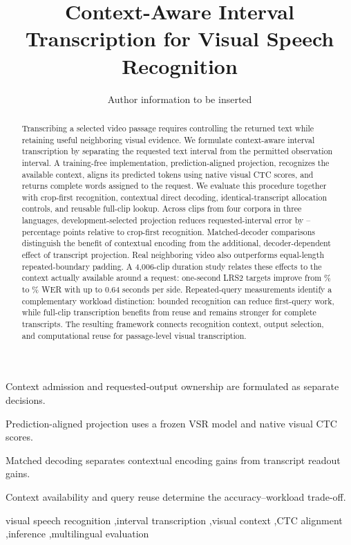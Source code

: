 \documentclass[authoryear,preprint,review,12pt]{elsarticle}
\begin{document}
\begin{frontmatter}

\title{Context-Aware Interval Transcription for Visual Speech Recognition}

\author[inst1]{Author information to be inserted}
\address[inst1]{Affiliation to be inserted, City, Country}

\begin{abstract}
Transcribing a selected video passage requires controlling the returned text while retaining
useful neighboring visual evidence. We formulate context-aware interval transcription by separating
the requested text interval from the permitted observation interval. A training-free implementation,
prediction-aligned projection, recognizes the available context, aligns its predicted tokens using
native visual CTC scores, and returns complete words assigned to the request. We evaluate this
procedure together with crop-first recognition, contextual direct decoding, identical-transcript
allocation controls, and reusable full-clip lookup. Across \PrimaryClips{} clips from four corpora
in three languages, development-selected projection reduces requested-interval error by
\PrimaryGainMin{}--\PrimaryGainMax{} percentage points relative to crop-first recognition.
Matched-decoder comparisons distinguish the benefit of contextual encoding from the additional,
decoder-dependent effect of transcript projection. Real neighboring video also outperforms
equal-length repeated-boundary padding. A 4,006-clip duration study relates these effects to the
context actually available around a request: one-second LRS2 targets improve from
\EnglishOneNoContext{}\% to \EnglishOneContext{}\% WER with up to 0.64 seconds per side.
Repeated-query measurements identify a complementary workload distinction: bounded recognition
can reduce first-query work, while full-clip transcription benefits from reuse and remains stronger
for complete transcripts. The resulting framework connects recognition context, output selection,
and computational reuse for passage-level visual transcription.
\end{abstract}

\begin{highlights}
\item Context admission and requested-output ownership are formulated as separate decisions.
\item Prediction-aligned projection uses a frozen VSR model and native visual CTC scores.
\item Matched decoding separates contextual encoding gains from transcript readout gains.
\item Context availability and query reuse determine the accuracy--workload trade-off.
\end{highlights}

\begin{keyword}
visual speech recognition \sep interval transcription \sep visual context
\sep CTC alignment \sep inference \sep multilingual evaluation
\end{keyword}

\end{frontmatter}
\end{document}
